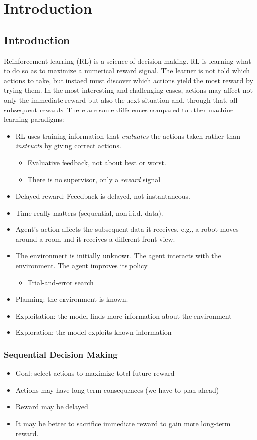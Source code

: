 \chapter{Introduction}
\section{Introduction}

Reinforcement learning (RL) is a science of decision making. RL is learning what to do so as to maximize a numerical reward signal. The learner is not told which actions to take, but instaed must discover which actions yield the most reward by trying them. In the most interesting and challenging cases, actions may affect not only the immediate reward but also the next situation and, through that, all subsequent rewards. There are some differences compared to other machine learning paradigms:
\begin{itemize}
	\item RL uses training information that \textit{evaluates} the actions taken rather than \textit{instructs} by giving correct actions.
		\begin{itemize}
			\item Evaluative feedback, not about best or worst.
			\item There is no supervisor, only a \textit{reward} signal
		\end{itemize}
	\item Delayed reward: Feeedback is delayed, not instantaneous. 
	\item Time really matters (sequential, non i.i.d. data). 
	\item Agent's action affects the subsequent data it receives. e.g., a robot moves around a room and it receives a different front view.  
	\item The environment is initially unknown. The agent interacts with the environment. The agent improves its policy
		\begin{itemize}
			\item Trial-and-error search
		\end{itemize}
	\item Planning: the environment is known. 
	\item Exploitation: the model finds more information about the environment
	\item Exploration: the model exploits known information
\end{itemize}

\subsection{Sequential Decision Making}
\begin{itemize}
	\item Goal: select actions to maximize total future reward
	\item Actions may have long term consequences (we have to plan ahead)
	\item Reward may be delayed
	\item It may be better to sacrifice immediate reward to gain more long-term reward. 
\end{itemize}

